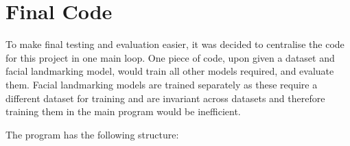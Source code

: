 \section{Final Code}


To make final testing and evaluation easier, it was decided to centralise the code for this project in one main loop. One piece of code, upon given a dataset and facial landmarking model, would train all other models required, and evaluate them. Facial landmarking models are trained separately as these require a different dataset for training and are invariant across datasets and therefore training them in the main program would be inefficient.

The program has the following structure:

